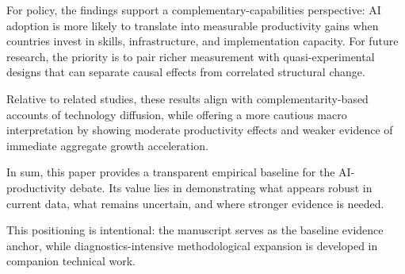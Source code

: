 For policy, the findings support a complementary-capabilities perspective: AI adoption is more likely to translate into measurable productivity gains when countries invest in skills, infrastructure, and implementation capacity. For future research, the priority is to pair richer measurement with quasi-experimental designs that can separate causal effects from correlated structural change.

Relative to related studies, these results align with complementarity-based accounts of technology diffusion, while offering a more cautious macro interpretation by showing moderate productivity effects and weaker evidence of immediate aggregate growth acceleration.

In sum, this paper provides a transparent empirical baseline for the AI-productivity debate. Its value lies in demonstrating what appears robust in current data, what remains uncertain, and where stronger evidence is needed.

This positioning is intentional: the manuscript serves as the baseline evidence anchor, while diagnostics-intensive methodological expansion is developed in companion technical work.

